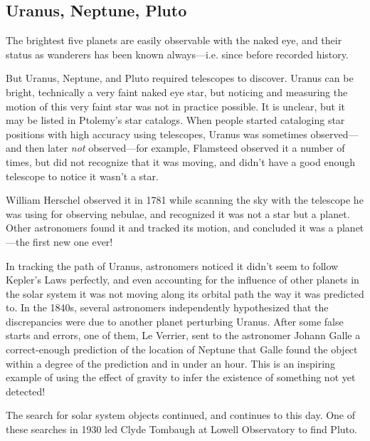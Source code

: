 \documentclass[12pt, preprint]{aastex}
\begin{document}
\subsection{Uranus, Neptune, Pluto}

The brightest five planets are easily observable with the naked eye,
and their status as wanderers has been known always---i.e. since
before recorded history.

But Uranus, Neptune, and Pluto required telescopes to discover. Uranus
can be bright, technically a very faint naked eye star, but noticing
and measuring the motion of this very faint star was not in practice
possible. It is unclear, but it may be listed in Ptolemy's star
catalogs. When people started cataloging star positions with high
accuracy using telescopes, Uranus was sometimes observed---and then
later {\it not} observed---for example, Flamsteed observed it a number
of times, but did not recognize that it was moving, and didn't have a
good enough telescope to notice it wasn't a star.

William Herschel observed it in 1781 while scanning the sky with the
telescope he was using for observing nebulae, and recognized it was
not a star but a planet. Other astronomers found it and tracked its
motion, and concluded it was a planet---the first new one ever!

In tracking the path of Uranus, astronomers noticed it didn't seem to
follow Kepler's Laws perfectly, and even accounting for the influence
of other planets in the solar system it was not moving along its
orbital path the way it was predicted to. In the 1840s, several
astronomers independently hypothesized that the discrepancies were due
to another planet perturbing Uranus. After some false starts and
errors, one of them, Le Verrier, sent to the astronomer Johann Galle a
correct-enough prediction of the location of Neptune that Galle found
the object within a degree of the prediction and in under an
hour. This is an inspiring example of using the effect of gravity to
infer the existence of something not yet detected!

The search for solar system objects continued, and continues to this
day. One of these searches in 1930 led Clyde Tombaugh at Lowell
Observatory to find Pluto.
\end{document}
